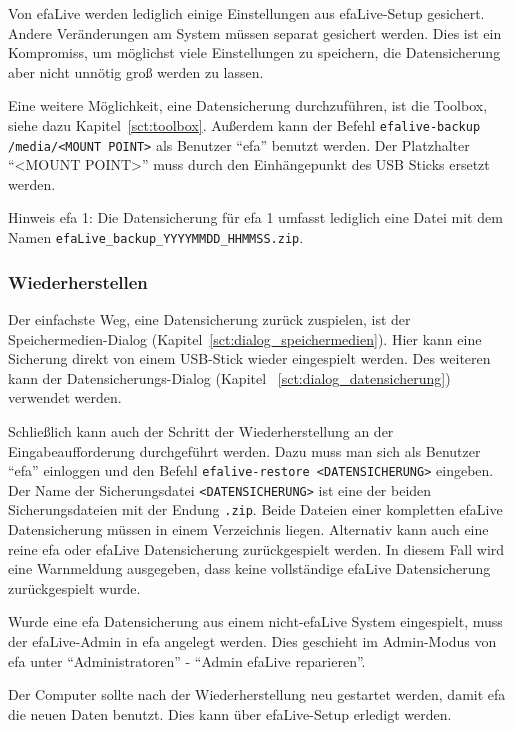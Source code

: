 \documentclass[a4paper,12pt,twoside]{article}
\begin{document}
Von efaLive werden lediglich einige Einstellungen aus efaLive-Setup
gesichert. Andere Veränderungen am System müssen separat gesichert
werden. Dies ist ein Kompromiss, um möglichst viele Einstellungen zu
speichern, die Datensicherung aber nicht unnötig groß werden zu lassen.

Eine weitere Möglichkeit, eine Datensicherung durchzuführen, ist die
Toolbox, siehe dazu Kapitel~\ref{sct:toolbox}. Außerdem kann der Befehl
\texttt{efalive-backup /media/{\textless}MOUNT POINT{\textgreater}} 
als Benutzer "`efa"' benutzt werden. Der Platzhalter "`{\textless}MOUNT 
POINT{\textgreater}"' muss durch den Einhängepunkt des USB Sticks 
ersetzt werden.


Hinweis efa 1: Die Datensicherung für efa 1 umfasst lediglich eine Datei
mit dem Namen \texttt{efaLive\_backup\_YYYYMMDD\_HHMMSS.zip}.


\subsubsection{Wiederherstellen}
\label{sct:daten_wiederherstellen}
Der einfachste Weg, eine Datensicherung zurück zuspielen, ist der
Speichermedien-Dialog (Kapitel~\ref{sct:dialog_speichermedien}). Hier
kann eine Sicherung direkt von einem USB-Stick wieder eingespielt
werden. Des weiteren kann der Datensicherungs-Dialog (Kapitel
~\ref{sct:dialog_datensicherung}) verwendet werden.

Schließlich kann auch der Schritt der Wiederherstellung an der
Eingabeaufforderung durchgeführt werden. Dazu muss man sich als
Benutzer "`efa"' einloggen und den Befehl
\texttt{efalive-restore {\textless}DATENSICHERUNG{\textgreater}} eingeben. Der
Name der Sicherungsdatei \texttt{{\textless}DATENSICHERUNG{\textgreater}} ist
eine der beiden Sicherungsdateien mit der Endung \texttt{.zip}. Beide Dateien
einer kompletten efaLive Datensicherung müssen in einem Verzeichnis liegen. 
Alternativ kann auch eine reine efa oder efaLive Datensicherung zurückgespielt
werden. In diesem Fall wird eine Warnmeldung ausgegeben, dass keine vollständige
efaLive Datensicherung zurückgespielt wurde.

Wurde eine efa Datensicherung aus einem nicht-efaLive System eingespielt, muss
der efaLive-Admin in efa angelegt werden. Dies geschieht im Admin-Modus von efa
unter "`Administratoren"' - "`Admin efaLive reparieren"'.

Der Computer sollte nach der Wiederherstellung neu gestartet werden,
damit efa die neuen Daten benutzt. Dies kann über efaLive-Setup
erledigt werden.
\end{document}
